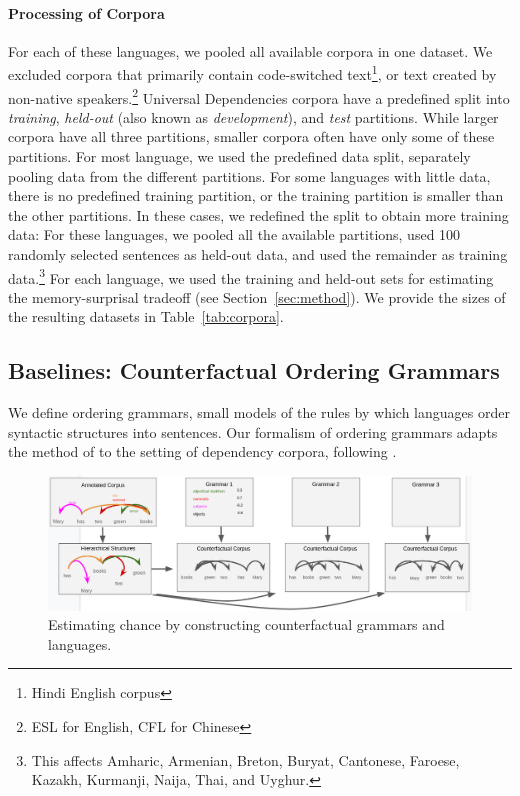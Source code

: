 \paragraph{Processing of Corpora}
For each of these languages, we pooled all available corpora in one dataset.
We excluded corpora that primarily contain code-switched text\footnote{Hindi English corpus}, or text created by non-native speakers.\footnote{ESL for English, CFL for Chinese}
Universal Dependencies corpora have a predefined split into \emph{training}, \emph{held-out} (also known as \emph{development}), and \emph{test} partitions.
While larger corpora have all three partitions, smaller corpora often have only some of these partitions.
For most language, we used the predefined data split, separately pooling data from the different partitions. %
For some languages with little data, there is no predefined training partition, or the training partition is smaller than the other partitions.
In these cases, we redefined the split to obtain more training data:
For these languages, we pooled all the available partitions, used 100 randomly selected sentences as held-out data, and used the remainder as training data.\footnote{This affects Amharic, Armenian, Breton, Buryat, Cantonese, Faroese, Kazakh, Kurmanji, Naija, Thai, and Uyghur.}
For each language, we used the training and held-out sets for estimating the memory-surprisal tradeoff (see Section~\ref{sec:method}).
We provide the sizes of the resulting datasets in Table~\ref{tab:corpora}.



\subsection{Baselines: Counterfactual Ordering Grammars}
We define ordering grammars, small models of the rules by which languages order syntactic structures into sentences.
Our formalism of ordering grammars adapts the method of \cite{gildea-optimizing-2007, gildea-grammars-2010, gildea-human-2015} to the setting of dependency corpora, following \cite{hahn-universals-2020}.




\begin{figure}
\centering
\includegraphics[width=\textwidth]{figures-gdrive/counterfactual-languages.png}
	\caption{ Estimating chance by constructing counterfactual grammars and languages.}\label{fig:grammars}
\end{figure}



